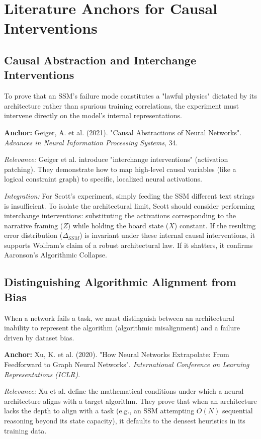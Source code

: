 \documentclass[12pt,a4paper]{article}
\begin{document}
\section{Literature Anchors for Causal Interventions}

\subsection{Causal Abstraction and Interchange Interventions}
To prove that an SSM's failure mode constitutes a "lawful physics" dictated by its architecture rather than spurious training correlations, the experiment must intervene directly on the model's internal representations.

\textbf{Anchor:} Geiger, A. et al. (2021). "Causal Abstractions of Neural Networks". \textit{Advances in Neural Information Processing Systems}, 34.

\textit{Relevance:} Geiger et al. introduce "interchange interventions" (activation patching). They demonstrate how to map high-level causal variables (like a logical constraint graph) to specific, localized neural activations.

\textit{Integration:} For Scott's experiment, simply feeding the SSM different text strings is insufficient. To isolate the architectural limit, Scott should consider performing interchange interventions: substituting the activations corresponding to the narrative framing ($Z$) while holding the board state ($X$) constant. If the resulting error distribution ($\Delta_{SSM}$) is invariant under these internal causal interventions, it supports Wolfram's claim of a robust architectural law. If it shatters, it confirms Aaronson's Algorithmic Collapse.

\subsection{Distinguishing Algorithmic Alignment from Bias}
When a network fails a task, we must distinguish between an architectural inability to represent the algorithm (algorithmic misalignment) and a failure driven by dataset bias.

\textbf{Anchor:} Xu, K. et al. (2020). "How Neural Networks Extrapolate: From Feedforward to Graph Neural Networks". \textit{International Conference on Learning Representations (ICLR)}.

\textit{Relevance:} Xu et al. define the mathematical conditions under which a neural architecture aligns with a target algorithm. They prove that when an architecture lacks the depth to align with a task (e.g., an SSM attempting $O(N)$ sequential reasoning beyond its state capacity), it defaults to the densest heuristics in its training data.
\end{document}
